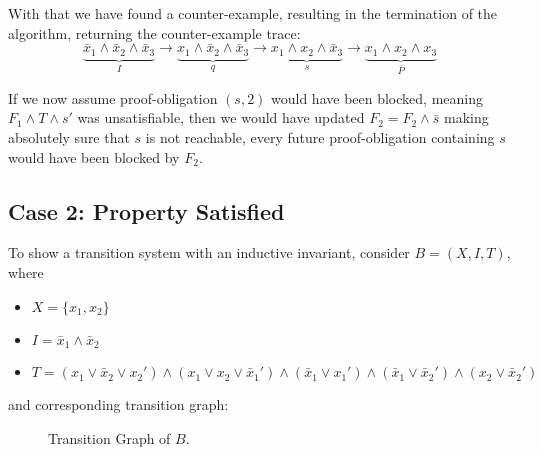 \documentclass[11pt, a4paper, BCOR=10mm, ngerman]{scrbook}
\begin{document}
With that we have found a counter-example, resulting in the termination of the algorithm, returning the counter-example trace: 
\begin{equation*}
\underbrace{\bar x_1 \land \bar x_2 \land \bar x_3}_{I} \rightarrow \underbrace{x_1 \land \bar x_2 \land \bar x_3}_{q} \rightarrow \underbrace{x_1 \land x_2 \land \bar x_3}_{s} \rightarrow \underbrace{x_1 \land x_2 \land x_3}_{\bar P}   
\end{equation*}

If we now assume proof-obligation $(s, 2)$ would have been blocked, meaning $F_1 \land T \land s'$ was unsatisfiable, then we would have updated $F_2 = F_2 \land \bar s$ making absolutely sure that $s$ is not reachable, every future proof-obligation containing $s$ would have been blocked by $F_2$.

\pagebreak

\subsection{Case 2: Property Satisfied}
To show a transition system with an inductive invariant, consider $B = (X, I, T)$, where
\begin{itemize}
\item $X = \{x_1, x_2\}$
\item $I = \bar x_1 \land \bar x_2 $
\item  $T = ( x_1 \lor \bar x_2 \lor x_2') \land (x_1 \lor x_2 \lor \bar x_1') \land (\bar x_1 \lor x_1') \land (\bar x_1 \lor \bar x_2') \land (x_2 \lor \bar x_2')$
\end{itemize}
and corresponding transition graph: \par

\begin{figure}[H]
\centering
{}
  \caption{Transition Graph of $B$.}
 \end{figure}
 \label{ex1}  
\end{document}
